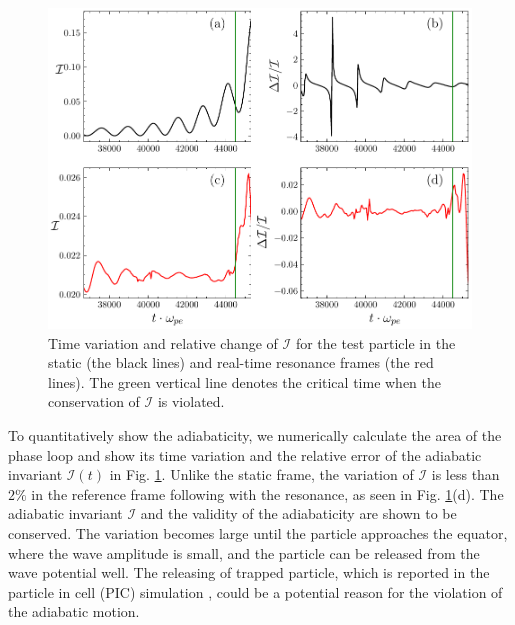 \begin{figure}
    \centering
    \includegraphics[scale=0.5]{img/adiaI.pdf}
    \caption{Time variation and  relative change of $\mathcal{I}$ for the test particle in the static (the black lines) and  real-time resonance  frames (the red lines). The green vertical line denotes the critical time when the conservation of $\mathcal{I}$ is violated.
    }
    \label{fig.I}
\end{figure}
To quantitatively show the adiabaticity, we numerically calculate the area of the phase loop and show its time variation 
and the relative error of the adiabatic invariant $\mathcal{I}(t)$ in Fig. \ref{fig.I}.
Unlike the static frame, the variation of $\mathcal{I}$ is less than $2\%$ in the reference frame following with the resonance, as seen in Fig. \ref{fig.I}(d). 
The adiabatic invariant $\mathcal{I}$ and the validity of the adiabaticity are shown to be conserved. 
The variation becomes large until the particle approaches the equator, where the wave amplitude is small, and the particle can be released from the wave potential well. 
The releasing of trapped particle, which is reported in the particle in cell (PIC) simulation \cite{tao_trap-release-amplify_2021}, could be a potential reason for the violation of the adiabatic motion.

